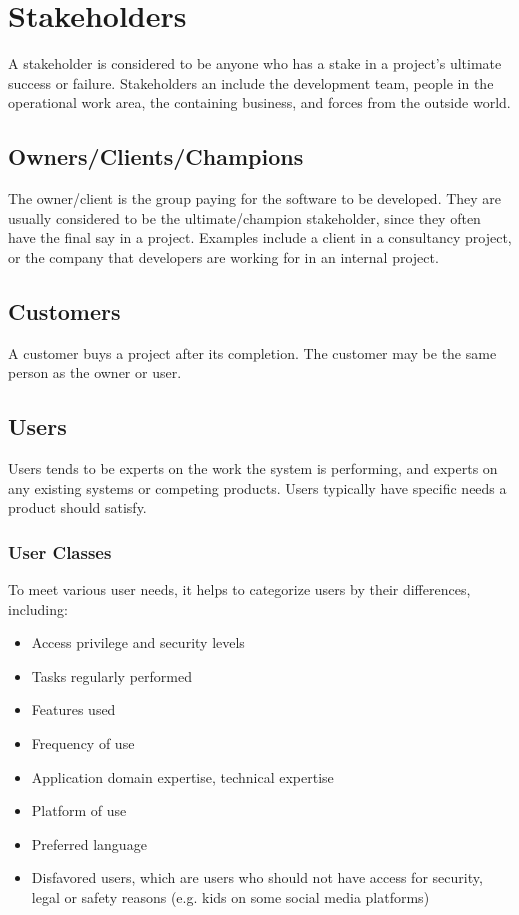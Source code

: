 \documentclass[12pt,titlepage]{article}
\let\stdsection\section
\renewcommand\section{\clearpage\stdsection}
\begin{document}
  \section{Stakeholders}
    A stakeholder is considered to be anyone who has a stake in a project's ultimate success or failure. Stakeholders an include the development
    team, people in the operational work area, the containing business, and forces from the outside world.

    \subsection{Owners/Clients/Champions}
      The owner/client is the group paying for the software to be developed. They are usually considered to be the ultimate/champion stakeholder,
      since they often have the final say in a project. Examples include a client in a consultancy project, or the company that developers are working
      for in an internal project.

    \subsection{Customers}
      A customer buys a project after its completion. The customer may be the same person as the owner or user.

    \subsection{Users}
      Users tends to be experts on the work the system is performing, and experts on any existing systems or competing products. Users typically
      have specific needs a product should satisfy.

      \subsubsection{User Classes}
        To meet various user needs, it helps to categorize users by their differences, including:
        \begin{itemize}
          \item Access privilege and security levels
          \item Tasks regularly performed
          \item Features used
          \item Frequency of use
          \item Application domain expertise, technical expertise
          \item Platform of use
          \item Preferred language
          \item Disfavored users, which are users who should not have access for security, legal or safety reasons (e.g. kids on some social media platforms)
        \end{itemize}
\end{document}
